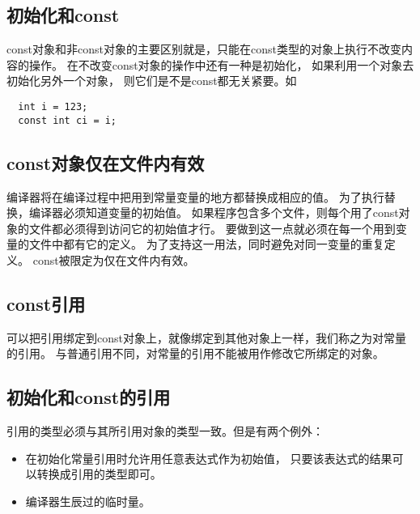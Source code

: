 \subsection{初始化和const}
const对象和非const对象的主要区别就是，只能在const类型的对象上执行不改变内容的操作。%
在不改变const对象的操作中还有一种是初始化，%
如果利用一个对象去初始化另外一个对象，%
则它们是不是const都无关紧要。如%
\begin{lstlisting}
  int i = 123;
  const int ci = i;
\end{lstlisting}

\subsection{const对象仅在文件内有效}
编译器将在编译过程中把用到常量变量的地方都替换成相应的值。%
为了执行替换，编译器必须知道变量的初始值。%
如果程序包含多个文件，则每个用了const对象的文件都必须得到访问它的初始值才行。%
要做到这一点就必须在每一个用到变量的文件中都有它的定义。%
为了支持这一用法，同时避免对同一变量的重复定义。%
const被限定为仅在文件内有效。
\subsection{const引用}
可以把引用绑定到const对象上，就像绑定到其他对象上一样，我们称之为对常量的引用。%
与普通引用不同，对常量的引用不能被用作修改它所绑定的对象。
\subsection{初始化和const的引用}
引用的类型必须与其所引用对象的类型一致。但是有两个例外：%
\begin{itemize}
\item{在初始化常量引用时允许用任意表达式作为初始值，%
    只要该表达式的结果可以转换成引用的类型即可。
  }
\item{编译器生辰过的临时量。}
\end{itemize}

